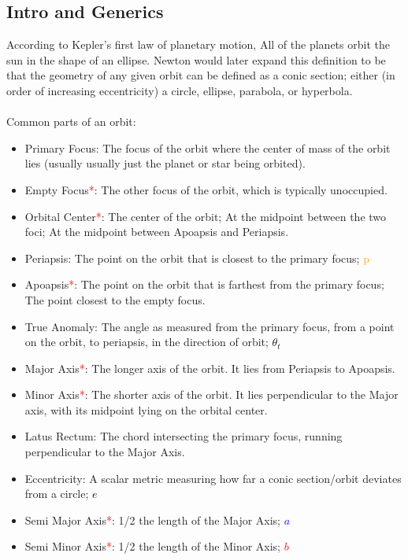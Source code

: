 \newcommand{\aster}{\textcolor{red}{*}}

\subsection{Intro and Generics}
According to Kepler's first law of planetary motion, All of the planets orbit the sun in the shape of an ellipse. Newton would later expand this definition to be that the geometry of any given orbit can be defined as a conic section; either (in order of increasing eccentricity) a circle, ellipse, parabola, or hyperbola.
\\\\

Common parts of an orbit:
\begin{itemize}
    \item Primary Focus: The focus of the orbit where the center of mass of the orbit lies (usually usually just the planet or star being orbited).
    \item Empty Focus\aster: The other focus of the orbit, which is typically unoccupied.
    \item Orbital Center\aster: The center of the orbit; At the midpoint between the two foci; At the midpoint between Apoapsis and Periapsis.
    \item Periapsis: The point on the orbit that is closest to the primary focus; \textcolor{orange}{p}
    \item Apoapsis\aster: The point on the orbit that is farthest from the primary focus; The point closest to the empty focus.
    \item True Anomaly: The angle as measured from the primary focus, from a point on the orbit, to periapsis, in the direction of orbit; \textcolor{black}{$\theta_t$}
    \item Major Axis\aster: The longer axis of the orbit. It lies from Periapsis to Apoapsis.
    \item Minor Axis\aster: The shorter axis of the orbit. It lies perpendicular to the Major axis, with its midpoint lying on the orbital center.
    \item Latus Rectum: The chord intersecting the primary focus, running perpendicular to the Major Axis.
    \item Eccentricity: A scalar metric measuring how far a conic section/orbit deviates from a circle; \textcolor{black}{$e$}
    \item Semi Major Axis\aster: 1/2 the length of the Major Axis;  \textcolor{blue}{$a$}
    \item Semi Minor Axis\aster: 1/2 the length of the Minor Axis; \textcolor{red}{$b$}

\end{itemize}
